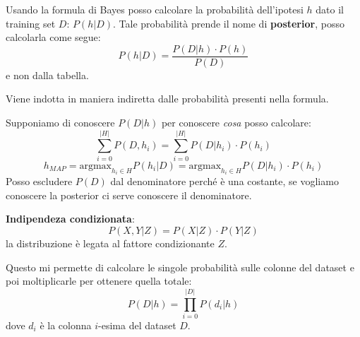 Usando la formula di Bayes posso calcolare la probabilità dell'ipotesi $h$ dato
il training set $D$: $P(h|D)$. Tale probabilità prende il nome di \textbf{posterior},
posso calcolarla come segue:
\begin{equation}
    P(h|D) = \frac{P(D|h) \cdot P(h)}{P(D)}
\end{equation}
e non dalla tabella.

Viene indotta in maniera indiretta dalle probabilità presenti nella formula.

Supponiamo di conoscere $P(D| h)$ per conoscere \textit{cosa} posso calcolare:
\begin{equation}
    \sum_{i = 0}^{|H|} P(D, h_i) = \sum_{i = 0}^{|H|} P(D|h_i) \cdot P(h_i)
\end{equation}
\begin{equation}
    h_{MAP} = \text{argmax}_{h_i \in H} P(h_i|D) = \text{argmax}_{h_i \in H}
    P(D|h_i) \cdot P(h_i)
\end{equation}
Posso escludere $P(D)$ dal denominatore perché è una costante, se vogliamo
conoscere la posterior ci serve conoscere il denominatore.
\begin{definizione}
    \textbf{Indipendeza condizionata}:
    \begin{equation}
        P(X, Y|Z) = P(X|Z) \cdot P(Y|Z)
    \end{equation}
    la distribuzione è legata al fattore condizionante $Z$.
\end{definizione}
Questo mi permette di calcolare le singole probabilità sulle colonne del dataset
e poi moltiplicarle per ottenere quella totale:
\begin{equation}
    P(D| h) = \prod_{i = 0}^{|D|} P(d_i|h)
\end{equation}
dove $d_i$ è la colonna $i$-esima del dataset $D$.
